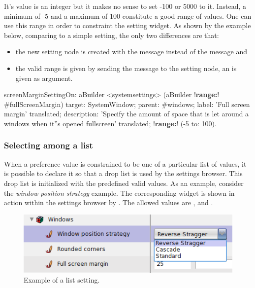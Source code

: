 \documentclass[a4paper,10pt,twoside]{book}
\begin{document}
It's value is an integer but it makes no sense to set -100 or 5000 to it. 
Instead, a minimum of -5 and a maximum of 100 constitute a good range of values. One can use this range in order to constraint the setting widget. As shown by the example below, comparing to a simple setting, the only two differences are that:
\begin{itemize}
\item 
	the new setting node is created with the  message instead of the  message and
\item
	the valid range is given by sending the  message to the  setting node, an  is given as argument.
\end{itemize}

\begin{code}{}
screenMarginSettingOn: aBuilder
	<systemsettings>
	(aBuilder !\textbf{range:}! #fullScreenMargin)
		target: SystemWindow;
		parent: #windows;
		label: 'Full screen margin' translated;
		description: 'Specify the amount of space that is let around a windows when it''s opened fullscreen' translated;
		!\textbf{range:}! (-5 to: 100).
\end{code}

\subsubsection{Selecting among a list}
When a preference value is constrained to be one of a particular list of values, it is possible to declare it so that a drop list is used by the settings browser. This drop list is initialized with the predefined valid values. As an example, consider the \textit{window position strategy} example. The corresponding widget is shown in action within the settings browser by . The allowed values are ,  and .

\begin{figure}[tbh]
\begin{center}
\includegraphics[scale=0.38]{window-position-strategy}
\caption{Example of a list setting.}
\end{center}
\end{figure}
\end{document}
